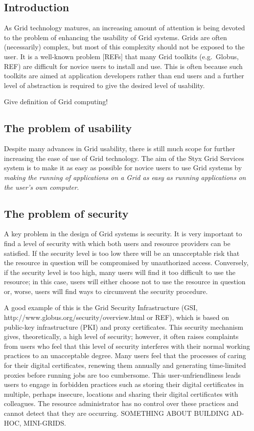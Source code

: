 \documentclass[a4paper]{article}
\begin{document}
\begin{multicols}{2}

\section{Introduction}
As Grid technology matures, an increasing amount of attention is being devoted to the problem of enhancing the usability of Grid systems.  Grids are often (necessarily) complex, but most of this complexity should not be exposed to the user.  It is a well-known problem [REFs] that many Grid toolkits (e.g.\ Globus, REF) are difficult for novice users to install and use.  This is often because such toolkits are aimed at application developers rather than end users and a further level of abstraction is required to give the desired level of usability.

Give definition of Grid computing!

\subsection{The problem of usability}
Despite many advances in Grid usability, there is still much scope for further increasing the ease of use of Grid technology.  The aim of the Styx Grid Services system is to make it as easy as possible for novice users to use Grid systems by {\em making the running of applications on a Grid as easy as running applications on the user's own computer\/}.

\subsection{The problem of security}
A key problem in the design of Grid systems is security.  It is very important to find a level of security with which both users and resource providers can be satisfied.  If the security level is too low there will be an unacceptable risk that the resource in question will be compromised by unauthorized access.  Conversely, if the security level is too high, many users will find it too difficult to use the resource; in this case, users will either choose not to use the resource in question or, worse, users will find ways to circumvent the security procedure.

A good example of this is the Grid Security Infrastructure (GSI, http://www.globus.org/security/overview.html or REF), which is based on public-key infrastructure (PKI) and proxy certificates.  This security mechanism gives, theoretically, a high level of security; however, it often raises complaints from users who feel that this level of security interferes with their normal working practices to an unacceptable degree.  Many users feel that the processes of caring for their digital certificates, renewing them annually and generating time-limited proxies before running jobs are too cumbersome.  This user-unfriendliness leads users to engage in forbidden practices such as storing their digital certificates in multiple, perhaps insecure, locations and sharing their digital certificates with colleagues.  The resource administrator has no control over these practices and cannot detect that they are occurring.  SOMETHING ABOUT BUILDING AD-HOC, MINI-GRIDS.


\end{multicols}
\end{document}

